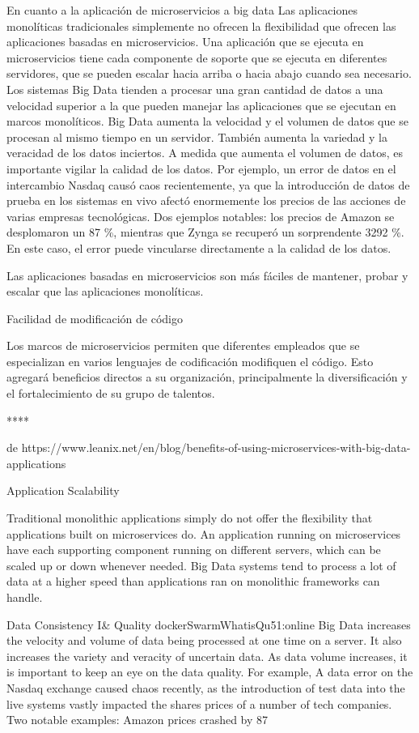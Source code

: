 En cuanto a la aplicación de microservicios a big data
Las aplicaciones monolíticas tradicionales simplemente no ofrecen la flexibilidad que ofrecen las aplicaciones basadas en microservicios. Una aplicación que se ejecuta en microservicios tiene cada componente de soporte que se ejecuta en diferentes servidores, que se pueden escalar hacia arriba o hacia abajo cuando sea necesario. Los sistemas Big Data tienden a procesar una gran cantidad de datos a una velocidad superior a la que pueden manejar las aplicaciones que se ejecutan en marcos monolíticos.
Big Data aumenta la velocidad y el volumen de datos que se procesan al mismo tiempo en un servidor. También aumenta la variedad y la veracidad de los datos inciertos. A medida que aumenta el volumen de datos, es importante vigilar la calidad de los datos. Por ejemplo, un error de datos en el intercambio Nasdaq causó caos recientemente, ya que la introducción de datos de prueba en los sistemas en vivo afectó enormemente los precios de las acciones de varias empresas tecnológicas. Dos ejemplos notables: los precios de Amazon se desplomaron un 87 \%, mientras que Zynga se recuperó un sorprendente 3292 \%. En este caso, el error puede vincularse directamente a la calidad de los datos.

Las aplicaciones basadas en microservicios son más fáciles de mantener, probar y escalar que las aplicaciones monolíticas.

Facilidad de modificación de código

Los marcos de microservicios permiten que diferentes empleados que se especializan en varios lenguajes de codificación modifiquen el código. Esto agregará beneficios directos a su organización, principalmente la diversificación y el fortalecimiento de su grupo de talentos.



\cite{Mauersberger2022Apr}
****

de https://www.leanix.net/en/blog/benefits-of-using-microservices-with-big-data-applications

Application Scalability

Traditional monolithic applications simply do not offer the flexibility that applications built on microservices do. An application running on microservices have each supporting component running on different servers, which can be scaled up or down whenever needed. Big Data systems tend to process a lot of data at a higher speed than applications ran on monolithic frameworks can handle.

Data Consistency I\& Quality
dockerSwarmWhatisQu51:online
Big Data increases the velocity and volume of data being processed at one time on a server. It also increases the variety and veracity of uncertain data. As data volume increases, it is important to keep an eye on the data quality. For example, A data error on the Nasdaq exchange caused chaos recently, as the introduction of test data into the live systems vastly impacted the shares prices of a number of tech companies. Two notable examples: Amazon prices crashed by 87%

